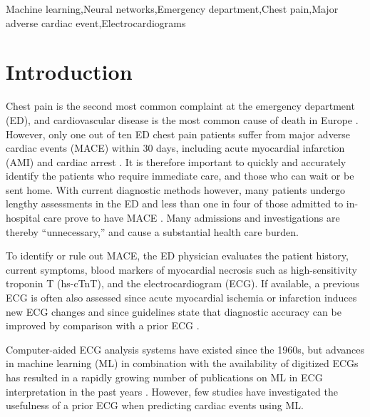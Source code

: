 \documentclass[preprint]{elsarticle}
\begin{document}
\begin{frontmatter}
\begin{keyword}
Machine learning\sep Neural networks\sep Emergency department\sep Chest pain\sep Major adverse cardiac event\sep Electrocardiograms
\end{keyword}

\end{frontmatter}



\section{Introduction}
\label{sec:introduction}
Chest pain is the second most common complaint at the emergency department (ED), and cardiovascular disease is the most common cause of death in Europe \citep{timmis2022}. However, only one out of ten ED chest pain patients suffer from major adverse cardiac events (MACE) within 30 days, including acute myocardial infarction (AMI) and cardiac arrest \citep{mokhtari2016}. It is therefore important to quickly and accurately identify the patients who require immediate care, and those who can wait or be sent home. With current diagnostic methods however, many patients undergo lengthy assessments in the ED and less than one in four of those admitted to in-hospital care prove to have MACE \citep{????}. Many admissions and investigations are thereby ``unnecessary,'' and cause a substantial health care burden.

To identify or rule out MACE, the ED physician evaluates the patient history, current symptoms, blood markers of myocardial necrosis such as high-sensitivity troponin T (hs-cTnT), and the electrocardiogram (ECG). If available, a previous ECG is often also assessed since acute myocardial ischemia or infarction induces new ECG changes and since guidelines state that diagnostic accuracy can be improved by comparison with a prior ECG \citep{anderson2013,lee1990}.

Computer-aided ECG analysis systems have existed since the 1960s, but advances in machine learning (ML) in combination with the availability of digitized ECGs has resulted in a rapidly growing number of publications on ML in ECG interpretation in the past years \citep{pipberger1961,ansari2017,liu2021}. However, few studies have investigated the usefulness of a prior ECG when predicting cardiac events using ML. 
\end{document}
